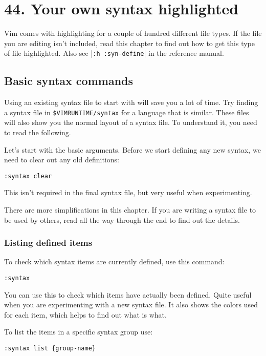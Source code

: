 \section{44. Your own syntax highlighted}
\label{Your own syntax highlighted}
Vim comes with highlighting for a couple of hundred different file types.
If the file you are editing isn't included, read this chapter to find out how to get this type of file highlighted.
Also see |\verb!:h :syn-define!| in the reference manual.
\subsection{Basic syntax commands}
Using an existing syntax file to start with will save you a lot of time.
Try finding a syntax file in \verb!$VIMRUNTIME/syntax! for a language that is similar.
These files will also show you the normal layout of a syntax file.
To understand it, you need to read the following.

Let's start with the basic arguments.
Before we start defining any new syntax, we need to clear out any old definitions:

\begin{Verbatim}[samepage=true]
 :syntax clear
\end{Verbatim}

This isn't required in the final syntax file, but very useful when experimenting.

There are more simplifications in this chapter.
If you are writing a syntax file to be used by others, read all the way through the end to find out the details.

\subsubsection{Listing defined items}
To check which syntax items are currently defined, use this command:

\begin{Verbatim}[samepage=true]
 :syntax
\end{Verbatim}

You can use this to check which items have actually been defined.
Quite useful when you are experimenting with a new syntax file.
It also shows the colors used for each item, which helps to find out what is what.

To list the items in a specific syntax group use:

\begin{Verbatim}[samepage=true]
 :syntax list {group-name}
\end{Verbatim}

